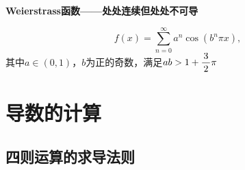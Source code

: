 \begin{shaded}
	{\bf Weierstrass函数——处处连续但处处不可导}
	
	$$f(x)=\sum\limits_{n=0}^{\infty}a^n\cos(b^n\pi x),$$
	其中$a\in(0,1)$，$b$为正的奇数，满足$ab>1+\displaystyle\frac{\,{3}\,}{\,{2}\,}\pi$
	
	\begin{center}
	\end{center}
\end{shaded}

\section{导数的计算}

\subsection{四则运算的求导法则}

